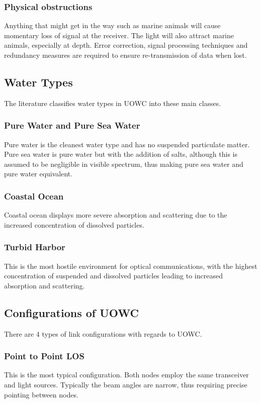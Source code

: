 \subsubsection{Physical obstructions}
Anything that might get in the way such as marine animals will cause
momentary loss of signal at the receiver. The light will also attract
marine animals, especially at depth. Error correction, signal processing
techniques and redundancy measures are required to ensure re-transmission
of data when lost.

\subsection{Water Types}
The literature classifies water types in \ac{UOWC} into these main classes.

\subsubsection{Pure Water and Pure Sea Water}
Pure water is the cleanest water type and has no suspended particulate
matter. Pure sea water is pure water but with the addition of salts,
although this is assumed to be negligible in visible spectrum, thus
making pure sea water and pure water equivalent.

\subsubsection{Coastal Ocean}
Coastal ocean displays more severe absorption and scattering due to the
increased concentration of dissolved particles.

\subsubsection{Turbid Harbor}
This is the most hostile environment for optical communications,
with the highest concentration of suspended and dissolved particles
leading to increased absorption and scattering.




\subsection{Configurations of UOWC}
There are 4 types of link configurations with regards to \ac{UOWC}.

\subsubsection{Point to Point \ac{LOS}}
This is the most typical configuration. Both nodes employ the same
transceiver and light sources. Typically the beam angles are narrow, thus
requiring precise pointing between nodes.

